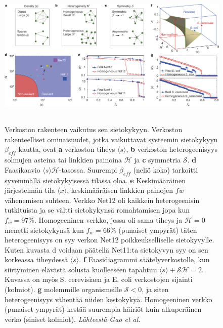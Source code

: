 \documentclass[finnish,12pt,a4paper,pdftex,elec,utf8]{aaltothesis}
\begin{document}
\begin{figure}[htb]
\centering \includegraphics[height=7cm]{Recilience_2}
\caption{Verkoston rakenteen vaikutus sen sietokykyyn. Verkoston rakenteelliset ominaisuudet, jotka vaikuttavat systeemin sietokykyyn $\beta_{eff}$ kautta, ovat \textbf{a} verkoston tiheys $\langle s \rangle$, \textbf{b} verkoston heterogeenisyys solmujen asteina tai linkkien painoina $\mathcal{H}$ ja \textbf{c} symmetria $\mathcal{S}$. \textbf{d} Faasikaavio $\langle s \rangle \mathcal{H}$-tasossa. Suurempi $\beta_{eff}$ (neliö koko) tarkoitti syvemmällä sietokykyisessä tilassa oloa. \textbf{e} Keskimääräinen järjestelmän tila $\langle x \rangle $, keskimääräisen linkkien painojen $fw$ vähenemisen suhteen. Verkko Net12 oli kaikkein heterogeenisin tutkituista ja se vältti sietokykynsä romahtamisen jopa kun $f_w = 97 \%$. Homogeeninen verkko, jossa oli sama tiheys ja $\mathcal{H} = 0$ menetti sietokykynsä kun $f_w = 66\%$ (punaiset ympyrät) täten heterogeenisyys on syy verkon Net12 poikkeukselliselle sietokyvylle. Kuten kuvasta d voidaan päätellä Net11:ta sietokyvyn syy on sen korkeassa tiheydessä $\langle s \rangle $. \textbf{f} Faasidiagrammi säätelyverkostolle, kun siirtyminen elävästä solusta kuolleeseen tapahtuu $\langle s \rangle + \mathcal{S} \mathcal{H} = 2.$ Kuvassa on myös S. cerevisiaen ja E. coli verkostojen sijainti (kolmiot). \textbf{g} molemmille organismeille $\mathcal{S} <0$, ja siten heterogeenisyys vähentää niiden kestokykyä. Homogeeninen verkko (punaiset ympyrät) kestää suurempia häiriöt kuin alkuperäinen verko (siniset kolmiot). \label{fig:Recilience_2} \textit{Lähteestä Gao et al. \cite{Universal-resilience}}}
\end{figure}
\end{document}
